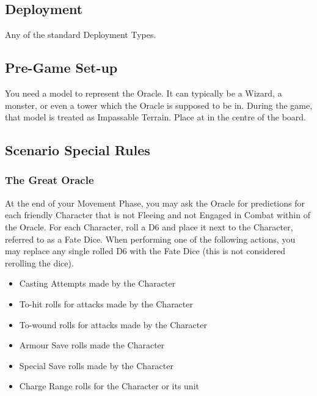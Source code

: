 
\label{AnEyeintheFuture}


\subsection*{Deployment}

Any of the standard Deployment Types.

\subsection*{Pre-Game Set-up}

You need a model to represent the Oracle. It can typically be a Wizard, a monster, or even a tower which the Oracle is supposed to be in. During the game, that model is treated as Impassable Terrain. Place at in the centre of the board.

\subsection*{Scenario Special Rules}

\subsubsection*{The Great Oracle}

At the end of your Movement Phase, you may ask the Oracle for predictions for each friendly Character that is not Fleeing 	and not Engaged in Combat within  of the Oracle. For each Character, roll a D6 and place it next to the Character, referred to as a Fate Dice. When performing one of the following actions, you may replace any single rolled D6 with the Fate Dice (this is not considered rerolling the dice).

\begin{itemize}
\item Casting Attempts made by the Character
\item To-hit rolls for attacks made by the Character
\item To-wound rolls for attacks made by the Character
\item Armour Save rolls made the Character
\item Special Save rolls made by the Character
\item Charge Range rolls for the Character or its unit
\end{itemize}

